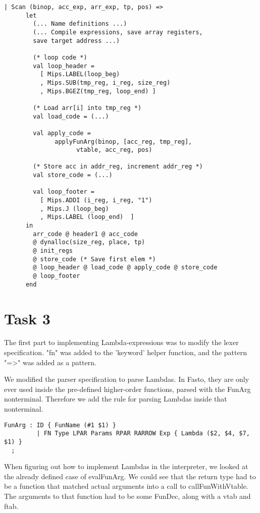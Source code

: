 \documentclass[10pt]{article}
\begin{document}
\begin{Verbatim}[frame=single]
  | Scan (binop, acc_exp, arr_exp, tp, pos) =>
      let
        (... Name definitions ...)
        (... Compile expressions, save array registers, 
        save target address ...)

        (* loop code *)
        val loop_header =
          [ Mips.LABEL(loop_beg)
          , Mips.SUB(tmp_reg, i_reg, size_reg)
          , Mips.BGEZ(tmp_reg, loop_end) ]
  
        (* Load arr[i] into tmp_reg *)
        val load_code = (...)
  
        val apply_code =
              applyFunArg(binop, [acc_reg, tmp_reg], 
              		vtable, acc_reg, pos)
  
        (* Store acc in addr_reg, increment addr_reg *)
        val store_code = (...)
              
        val loop_footer =
          [ Mips.ADDI (i_reg, i_reg, "1")
          , Mips.J (loop_beg)
          , Mips.LABEL (loop_end)  ]
      in
        arr_code @ header1 @ acc_code
        @ dynalloc(size_reg, place, tp)
        @ init_regs
        @ store_code (* Save first elem *)
        @ loop_header @ load_code @ apply_code @ store_code 
        @ loop_footer
      end
\end{Verbatim}

\section{Task 3}
The first part to implementing Lambda-expressions was to modify the lexer specification. "fn" was added to the 'keyword' helper function, and the pattern "=>" was added as a pattern.

We modified the parser specification to parse Lambdas. In Fasto, they are only ever used inside the pre-defined higher-order functions, parsed with the FunArg nonterminal. Therefore we add the rule for parsing Lambdas inside that nonterminal.
\begin{Verbatim}[frame=single]
  FunArg : ID { FunName (#1 $1) }
         | FN Type LPAR Params RPAR RARROW Exp { Lambda ($2, $4, $7, $1) }
  ;
\end{Verbatim}

When figuring out how to implement Lambdas in the interpreter, we looked at the already defined case of evalFunArg. We could see that the return type had to be a function that matched actual arguments into a call to callFunWithVtable. The arguments to that function had to be some FunDec, along with a vtab and ftab.
\end{document}

